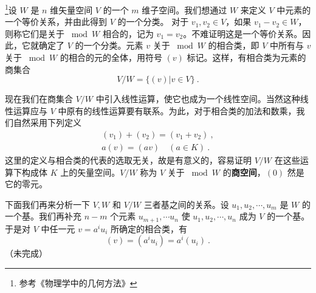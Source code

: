 

\footnote{参考《物理学中的几何方法》}设 $W$ 是 $n$ 维矢量空间 $V$ 的一个 $m$ 维子空间。我们想通过 $W$ 来定义 $V$ 中元素的一个等价关系，并由此得到 $V$ 的一个分类。
对于 $v_1,v_2\in V$，如果 $v_1-v_2\in W$，则称它们是关于 $\bmod W $ 相合的，记为 $v_1=v_2$。不难证明这是一个等价关系。因此，它就确定了 $V $ 的一个分类。元素 $v $ 关于 $\bmod W $ 的相合类，即 $V $ 中所有与 $v $ 关于 $\bmod W $ 的相合的元的全体，用符号 $(v) $ 标记。这样，有相合类为元素的商集合
\begin{equation}
V / W=\{(v) | v \in V\}~.
\end{equation}

现在我们在商集合 $V/W $ 中引入线性运算，使它也成为一个线性空间。当然这种线性运算应与 $V $ 中原有的线性运算要有联系。为此，对于相合类的加法和数乘，我们自然采用下列定义
\begin{equation}
\begin{array}{l}\left(v_{1}\right)+\left(v_{2}\right)=\left(v_{1}+v_{2}\right)~, \\ a(v)=(a v)\quad (a \in K)~.
\end{array}
\end{equation}
这里的定义与相合类的代表的选取无关，故是有意义的，容易证明 $V/W $ 在这些运算下构成体 $K $ 上的矢量空间。$V/W $ 称为 $V $ 关于 $\bmod W$ 的\textbf{商空间}，$(0)$ 然是它的零元。

下面我们再来分析一下 $V,W$ 和 $V/W $ 三者基之间的关系。设 $u_1,u_2,\cdots,u_m$ 是 $W $ 的一个基。我们再补充 $n- m$ 个元素 ${u}_{m+1}, \cdots {u}_{n}$ 使 $u_{1}, u_{2}, \cdots, u_{n}$ 成为 $V$ 的一个基。于是对 $V $ 中任一元 $v=a^iu_i$ 所确定的相合类，有
\begin{equation}
(v)=\left(a^{i} u_{i}\right)=a^{i}\left(u_{i}\right)~.
\end{equation}
（未完成）
